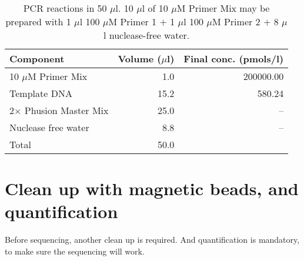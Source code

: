 \documentclass[a4paper,12pt]{article}
\begin{document}
\begin{table}
\begin{center}
\caption{PCR reactions in 50 $\mu$l. 10 $\mu$l of 10 $\mu$M Primer Mix may be prepared with 1 $\mu$l 100 $\mu$M Primer 1 $+$ 1 $\mu$l 100 $\mu$M Primer 2 $+$ 8 $\mu$l nuclease-free water.}\label{tau:PCR}
\vspace*{0.2cm}
\begin{tabular}{lrr}
\toprule
Component&Volume ($\mu$l)&Final conc. (pmols/l)\\
\midrule
10 $\mu$M Primer Mix&1.0&200000.00\\
Template DNA&15.2&580.24\\
2$\times$ Phusion Master Mix&25.0&--\\
Nuclease free water&8.8&--\\
\midrule
Total&50.0&\\
\bottomrule
\end{tabular}
\end{center}
\end{table}



\section{Clean up with magnetic beads, and quantification}
Before sequencing, another clean up is required. And quantification is mandatory, to make sure the sequencing will work.



\end{document}
